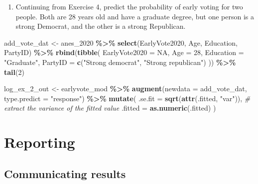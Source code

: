 \documentclass[
]{krantz}
\makeatletter
\newenvironment{Shaded}{\begin{snugshade}}{\end{snugshade}}
\newcommand{\AttributeTok}[1]{\textcolor[rgb]{0.27,0.27,0.27}{#1}}
\newcommand{\CommentTok}[1]{\textcolor[rgb]{0.37,0.37,0.37}{\textit{#1}}}
\newcommand{\ConstantTok}[1]{\textcolor[rgb]{0.37,0.37,0.37}{#1}}
\newcommand{\DecValTok}[1]{\textcolor[rgb]{0.06,0.06,0.06}{#1}}
\newcommand{\FunctionTok}[1]{\textcolor[rgb]{0.27,0.27,0.27}{\textbf{#1}}}
\newcommand{\NormalTok}[1]{#1}
\newcommand{\OtherTok}[1]{\textcolor[rgb]{0.37,0.37,0.37}{#1}}
\newcommand{\SpecialCharTok}[1]{\textcolor[rgb]{0.43,0.43,0.43}{\textbf{#1}}}
\newcommand{\StringTok}[1]{\textcolor[rgb]{0.5,0.5,0.5}{#1}}
\providecommand{\tightlist}{%
  \setlength{\itemsep}{0pt}\setlength{\parskip}{0pt}}
\newenvironment{kframe}{%
\medskip{}
\setlength{\fboxsep}{.8em}
 \def\at@end@of@kframe{}%
 \ifinner\ifhmode%
  \def\at@end@of@kframe{\end{minipage}}%
  \begin{minipage}{\columnwidth}%
 \fi\fi%
 \def\FrameCommand##1{\hskip\@totalleftmargin \hskip-\fboxsep
 \colorbox{shadecolor}{##1}\hskip-\fboxsep
     \hskip-\linewidth \hskip-\@totalleftmargin \hskip\columnwidth}%
 \MakeFramed {\advance\hsize-\width
   \@totalleftmargin\z@ \linewidth\hsize
   \@setminipage}}%
 {\par\unskip\endMakeFramed%
 \at@end@of@kframe}
\renewenvironment{Shaded}{\begin{kframe}}{\end{kframe}}
\makeatother
\begin{document}
\begin{enumerate}
\def\labelenumi{\arabic{enumi}.}
\setcounter{enumi}{4}
\tightlist
\item
  Continuing from Exercise 4, predict the probability of early voting for two people. Both are 28 years old and have a graduate degree, but one person is a strong Democrat, and the other is a strong Republican.
\end{enumerate}

\begin{Shaded}
\begin{Highlighting}[]
\NormalTok{add\_vote\_dat }\OtherTok{\textless{}{-}}\NormalTok{ anes\_2020 }\SpecialCharTok{\%\textgreater{}\%}
  \FunctionTok{select}\NormalTok{(EarlyVote2020, Age, Education, PartyID) }\SpecialCharTok{\%\textgreater{}\%}
  \FunctionTok{rbind}\NormalTok{(}\FunctionTok{tibble}\NormalTok{(}
    \AttributeTok{EarlyVote2020 =} \ConstantTok{NA}\NormalTok{,}
    \AttributeTok{Age =} \DecValTok{28}\NormalTok{,}
    \AttributeTok{Education =} \StringTok{"Graduate"}\NormalTok{,}
    \AttributeTok{PartyID =} \FunctionTok{c}\NormalTok{(}\StringTok{"Strong democrat"}\NormalTok{, }\StringTok{"Strong republican"}\NormalTok{)}
\NormalTok{  )) }\SpecialCharTok{\%\textgreater{}\%}
  \FunctionTok{tail}\NormalTok{(}\DecValTok{2}\NormalTok{)}

\NormalTok{log\_ex\_2\_out }\OtherTok{\textless{}{-}}\NormalTok{ earlyvote\_mod }\SpecialCharTok{\%\textgreater{}\%}
  \FunctionTok{augment}\NormalTok{(}\AttributeTok{newdata =}\NormalTok{ add\_vote\_dat, }\AttributeTok{type.predict =} \StringTok{"response"}\NormalTok{) }\SpecialCharTok{\%\textgreater{}\%}
  \FunctionTok{mutate}\NormalTok{(}
    \AttributeTok{.se.fit =} \FunctionTok{sqrt}\NormalTok{(}\FunctionTok{attr}\NormalTok{(.fitted, }\StringTok{"var"}\NormalTok{)),}
    \CommentTok{\# extract the variance of the fitted value}
    \AttributeTok{.fitted =} \FunctionTok{as.numeric}\NormalTok{(.fitted)}
\NormalTok{  )}
\end{Highlighting}
\end{Shaded}

\hypertarget{part-reporting}{%
\part{Reporting}\label{part-reporting}}

\hypertarget{c08-communicating-results}{%
\chapter{Communicating results}\label{c08-communicating-results}}
\end{document}
